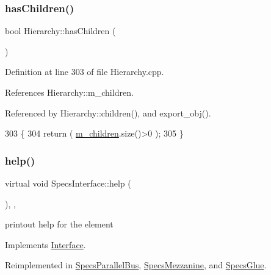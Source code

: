 \subsubsection{\texorpdfstring{has\+Children()}{hasChildren()}}
{\footnotesize\ttfamily bool Hierarchy\+::has\+Children (\begin{DoxyParamCaption}{ }\end{DoxyParamCaption})\hspace{0.3cm}{\ttfamily [inherited]}}



Definition at line 303 of file Hierarchy.\+cpp.



References Hierarchy\+::m\+\_\+children.



Referenced by Hierarchy\+::children(), and export\+\_\+obj().


\begin{DoxyCode}
303                               \{
304   \textcolor{keywordflow}{return} ( \hyperlink{classHierarchy_a038816763941fd4a930504917f60483b}{m\_children}.size()>0 );
305 \}
\end{DoxyCode}
\mbox{\label{classSpecsInterface_a24bf2b5e2da6c675ba5de3b226481a73}} 
\subsubsection{\texorpdfstring{help()}{help()}}
{\footnotesize\ttfamily virtual void Specs\+Interface\+::help (\begin{DoxyParamCaption}{ }\end{DoxyParamCaption})\hspace{0.3cm}{\ttfamily [inline]}, {\ttfamily [virtual]}, {\ttfamily [inherited]}}

printout help for the element 

Implements \hyperlink{classInterface_aedd3cf1d964c837e7848ccf81dc9c760}{Interface}.



Reimplemented in \hyperlink{classSpecsParallelBus_a67b05d066de051d33a6afff267f9178e}{Specs\+Parallel\+Bus}, \hyperlink{classSpecsMezzanine_a9cbb99c91d987194009be1cb81d2ba7c}{Specs\+Mezzanine}, and \hyperlink{classSpecsGlue_a04fd0c122ac6980833fd87af92377791}{Specs\+Glue}.



